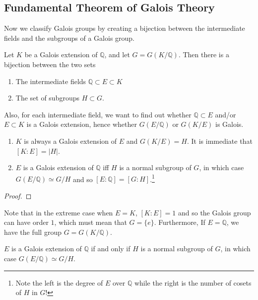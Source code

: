   \begin{example}
    
  \end{example}

\subsection{Fundamental Theorem of Galois Theory}

  Now we classify Galois groups by creating a bijection between the intermediate fields and the subgroups of a Galois group. 

  \begin{theorem}
    Let $K$ be a Galois extension of $\mathbb{Q}$, and let $G = G(K/\mathbb{Q})$. Then there is a bijection between the two sets
    \begin{enumerate}
      \item The intermediate fields $\mathbb{Q} \subset E \subset K$
      \item The set of subgroups $H \subset G$. 
    \end{enumerate} 
    Also, for each intermediate field, we want to find out whether $\mathbb{Q} \subset E$ and/or $E \subset K$ is a Galois extension, hence whether $G(E/\mathbb{Q})$ or $G(K/E)$ is Galois. 
    \begin{enumerate}
      \item $K$ is always a Galois extension of $E$ and $G(K/E) = H$. It is immediate that $[K:E] = |H|$. 
      \item $E$ is a Galois extension of $\mathbb{Q}$ iff $H$ is a normal subgroup of $G$, in which case $G(E/\mathbb{Q}) \simeq G/H$ and so $[E:\mathbb{Q}] = [G:H]$.\footnote{Note the left is the degree of $E$ over $\mathbb{Q}$ while the right is the number of cosets of $H$ in $G$!} 
    \end{enumerate}
  \end{theorem}
  \begin{proof}
    
  \end{proof}

  Note that in the extreme case when $E = K$, $[K:E] = 1$ and so the Galois group can have order $1$, which must mean that $G = \{e\}$. Furthermore, If $E = \mathbb{Q}$, we have the full group $G = G(K/\mathbb{Q})$. 

  \begin{corollary}
    $E$ is a Galois extension of $\mathbb{Q}$ if and only if $H$ is a normal subgroup of $G$, in which case $G(E/\mathbb{Q}) \simeq G/H$. 
  \end{corollary}

